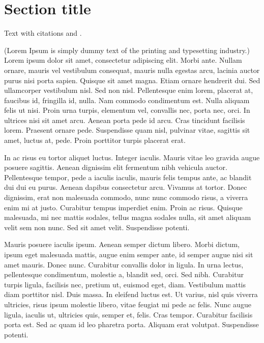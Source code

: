 \section{Section title}
\label{sec:1}
Text with citations \cite{RefB} and \cite{RefJ}.

(Lorem Ipsum is simply dummy text of the printing and typesetting industry.) Lorem ipsum dolor sit amet, consectetur adipiscing elit. Morbi ante. Nullam ornare, mauris vel vestibulum consequat, mauris nulla egestas arcu, lacinia auctor purus nisi porta sapien. Quisque sit amet magna. Etiam ornare hendrerit dui. Sed ullamcorper vestibulum nisl. Sed non nisl. Pellentesque enim lorem, placerat at, faucibus id, fringilla id, nulla. Nam commodo condimentum est. Nulla aliquam felis ut nisi. Proin urna turpis, elementum vel, convallis nec, porta nec, orci. In ultrices nisi sit amet arcu. Aenean porta pede id arcu. Cras tincidunt facilisis lorem. Praesent ornare pede. Suspendisse quam nisl, pulvinar vitae, sagittis sit amet, luctus at, pede. Proin porttitor turpis placerat erat.

In ac risus eu tortor aliquet luctus. Integer iaculis. Mauris vitae leo gravida augue posuere sagittis. Aenean dignissim elit fermentum nibh vehicula auctor. Pellentesque tempor, pede a iaculis iaculis, mauris felis tempus ante, ac blandit dui dui eu purus. Aenean dapibus consectetur arcu. Vivamus at tortor. Donec dignissim, erat non malesuada commodo, nunc nunc commodo risus, a viverra enim mi at justo. Curabitur tempus imperdiet enim. Proin ac risus. Quisque malesuada, mi nec mattis sodales, tellus magna sodales nulla, sit amet aliquam velit sem non nunc. Sed sit amet velit. Suspendisse potenti.

Mauris posuere iaculis ipsum. Aenean semper dictum libero. Morbi dictum, ipsum eget malesuada mattis, augue enim semper ante, id semper augue nisi sit amet mauris. Donec nunc. Curabitur convallis dolor in ligula. In urna lectus, pellentesque condimentum, molestie a, blandit sed, orci. Sed nibh. Curabitur turpis ligula, facilisis nec, pretium ut, euismod eget, diam. Vestibulum mattis diam porttitor nisl. Duis massa. In eleifend luctus est. Ut varius, nisl quis viverra ultricies, risus ipsum molestie libero, vitae feugiat mi pede ac felis. Nunc augue ligula, iaculis ut, ultricies quis, semper et, felis. Cras tempor. Curabitur facilisis porta est. Sed ac quam id leo pharetra porta. Aliquam erat volutpat. Suspendisse potenti.

